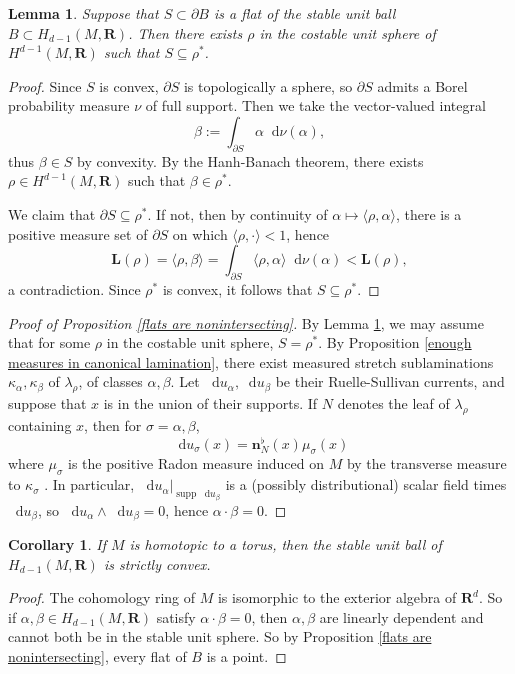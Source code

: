 \documentclass[reqno,11pt]{amsart}
\newcommand{\RR}{\mathbf{R}}
\newcommand*\dif{\mathop{}\!\mathrm{d}}
\DeclareMathOperator{\supp}{supp}
\newcommand{\normal}{\mathbf n}
\newcommand{\Comass}{\mathbf L}
\newtheorem{lemma}[theorem]{Lemma}
\newtheorem{corollary}[theorem]{Corollary}
\theoremstyle{definition}
\numberwithin{equation}{section}
\begin{document}
\begin{lemma} \label{flats have dual classes}
Suppose that $S \subset \partial B$ is a flat of the stable unit ball $B \subset H_{d - 1}(M, \RR)$.
Then there exists $\rho$ in the costable unit sphere of $H^{d - 1}(M, \RR)$ such that $S \subseteq \rho^*$.
\end{lemma}
\begin{proof}
Since $S$ is convex, $\partial S$ is topologically a sphere, so $\partial S$ admits a Borel probability measure $\nu$ of full support.
Then we take the vector-valued integral 
$$\beta := \int_{\partial S} \alpha \dif \nu(\alpha),$$
thus $\beta \in S$ by convexity.
By the Hanh-Banach theorem, there exists $\rho \in H^{d - 1}(M, \RR)$ such that $\beta \in \rho^*$.

We claim that $\partial S \subseteq \rho^*$.
If not, then by continuity of $\alpha \mapsto \langle \rho, \alpha\rangle$, there is a positive measure set of $\partial S$ on which $\langle \rho, \cdot\rangle < 1$, hence
$$\Comass(\rho) = \langle \rho, \beta\rangle = \int_{\partial S} \langle \rho, \alpha\rangle \dif \nu(\alpha) < \Comass(\rho),$$
a contradiction.
Since $\rho^*$ is convex, it follows that $S \subseteq \rho^*$.
\end{proof}

\begin{proof}[Proof of Proposition \ref{flats are nonintersecting}]
By Lemma \ref{flats have dual classes}, we may assume that for some $\rho$ in the costable unit sphere, $S = \rho^*$.
By Proposition \ref{enough measures in canonical lamination}, there exist measured stretch sublaminations $\kappa_\alpha, \kappa_\beta$ of $\lambda_\rho$, of classes $\alpha, \beta$.
Let $\dif u_\alpha, \dif u_\beta$ be their Ruelle-Sullivan currents, and suppose that $x$ is in the union of their supports.
If $N$ denotes the leaf of $\lambda_\rho$ containing $x$, then for $\sigma = \alpha, \beta$,
$$\dif u_\sigma(x) = \normal_N^\flat(x) \mu_\sigma(x)$$
where $\mu_\sigma$ is the positive Radon measure induced on $M$ by the transverse measure to $\kappa_\sigma$ \cite[Lemma 3.1]{BackusCML}.
In particular, $\dif u_\alpha|_{\supp \dif u_\beta}$ is a (possibly distributional) scalar field times $\dif u_\beta$, so $\dif u_\alpha \wedge \dif u_\beta = 0$, hence $\alpha \cdot \beta = 0$.
\end{proof}

\begin{corollary}
If $M$ is homotopic to a torus, then the stable unit ball of $H_{d - 1}(M, \RR)$ is strictly convex.
\end{corollary}
\begin{proof}
The cohomology ring of $M$ is isomorphic to the exterior algebra of $\RR^d$.
So if $\alpha, \beta \in H_{d - 1}(M, \RR)$ satisfy $\alpha \cdot \beta = 0$, then $\alpha, \beta$ are linearly dependent and cannot both be in the stable unit sphere.
So by Proposition \ref{flats are nonintersecting}, every flat of $B$ is a point.
\end{proof}
\end{document}

